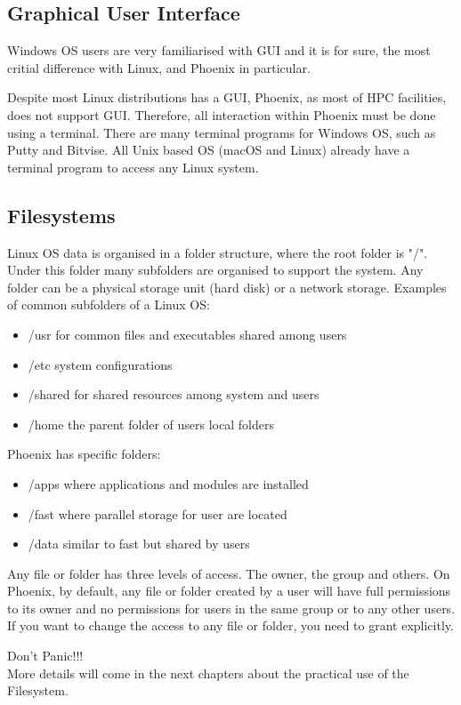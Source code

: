 \subsection{Graphical User Interface}
Windows OS users are very familiarised with GUI and it is for sure, the most critial difference with Linux, and Phoenix in particular. 

Despite most Linux distributions has a GUI, Phoenix, as most of HPC facilities, does not support GUI. Therefore, all interaction within Phoenix must be done using a terminal.
There are many terminal programs for Windows OS, such as Putty and Bitvise. All Unix based OS (macOS and Linux) already have a terminal program to access any Linux system.

\subsection{Filesystems}
Linux OS data is organised in a folder structure, where the root folder is "/". Under this folder many subfolders are organised to support the system.
Any folder can be a physical storage unit (hard disk) or a network storage.
Examples of common subfolders of a Linux OS:
\begin{itemize}
\item /usr for common files and executables shared among users
\item /etc system configurations
\item /shared for shared resources among system and users
\item /home the parent folder of users local folders
\end{itemize} 

Phoenix has specific folders:
\begin{itemize}
\item /apps where applications and modules are installed
\item /fast where parallel storage for user are located
\item /data similar to fast but shared by users
\end{itemize} 


Any file or folder has three levels of access. The owner, the group and others.
On Phoenix, by default, any file or folder created by a user will have full permissions to its owner and no permissions for users in the same group or to any other users.
If you want to change the access to any file or folder, you need to grant explicitly.

\begin{warning}
{\Huge Don't Panic!!!}\\
More details will come in the next chapters about the practical use of the Filesystem.
\end{warning}

